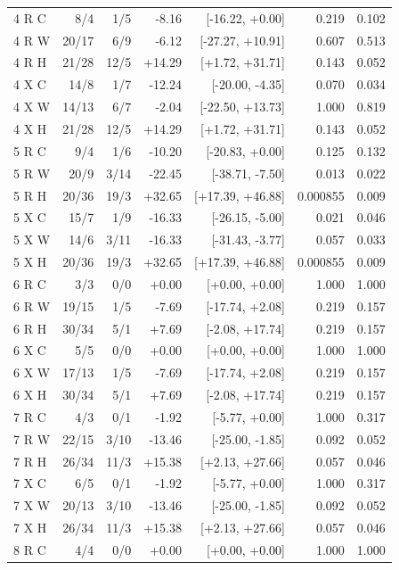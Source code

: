 {\begin{longtable}{lrrrrrr}
4 R C & 8/4 & 1/5 & -8.16 & [-16.22, +0.00] & 0.219 & 0.102\\
4 R W & 20/17 & 6/9 & -6.12 & [-27.27, +10.91] & 0.607 & 0.513\\
4 R H & 21/28 & 12/5 & +14.29 & [+1.72, +31.71] & 0.143 & 0.052\\
4 X C & 14/8 & 1/7 & -12.24 & [-20.00, -4.35] & 0.070 & 0.034\\
4 X W & 14/13 & 6/7 & -2.04 & [-22.50, +13.73] & 1.000 & 0.819\\
4 X H & 21/28 & 12/5 & +14.29 & [+1.72, +31.71] & 0.143 & 0.052\\
5 R C & 9/4 & 1/6 & -10.20 & [-20.83, +0.00] & 0.125 & 0.132\\
5 R W & 20/9 & 3/14 & -22.45 & [-38.71, -7.50] & 0.013 & 0.022\\
5 R H & 20/36 & 19/3 & +32.65 & [+17.39, +46.88] & 0.000855 & 0.009\\
5 X C & 15/7 & 1/9 & -16.33 & [-26.15, -5.00] & 0.021 & 0.046\\
5 X W & 14/6 & 3/11 & -16.33 & [-31.43, -3.77] & 0.057 & 0.033\\
5 X H & 20/36 & 19/3 & +32.65 & [+17.39, +46.88] & 0.000855 & 0.009\\
6 R C & 3/3 & 0/0 & +0.00 & [+0.00, +0.00] & 1.000 & 1.000\\
6 R W & 19/15 & 1/5 & -7.69 & [-17.74, +2.08] & 0.219 & 0.157\\
6 R H & 30/34 & 5/1 & +7.69 & [-2.08, +17.74] & 0.219 & 0.157\\
6 X C & 5/5 & 0/0 & +0.00 & [+0.00, +0.00] & 1.000 & 1.000\\
6 X W & 17/13 & 1/5 & -7.69 & [-17.74, +2.08] & 0.219 & 0.157\\
6 X H & 30/34 & 5/1 & +7.69 & [-2.08, +17.74] & 0.219 & 0.157\\
7 R C & 4/3 & 0/1 & -1.92 & [-5.77, +0.00] & 1.000 & 0.317\\
7 R W & 22/15 & 3/10 & -13.46 & [-25.00, -1.85] & 0.092 & 0.052\\
7 R H & 26/34 & 11/3 & +15.38 & [+2.13, +27.66] & 0.057 & 0.046\\
7 X C & 6/5 & 0/1 & -1.92 & [-5.77, +0.00] & 1.000 & 0.317\\
7 X W & 20/13 & 3/10 & -13.46 & [-25.00, -1.85] & 0.092 & 0.052\\
7 X H & 26/34 & 11/3 & +15.38 & [+2.13, +27.66] & 0.057 & 0.046\\
8 R C & 4/4 & 0/0 & +0.00 & [+0.00, +0.00] & 1.000 & 1.000\\

\end{longtable}}
